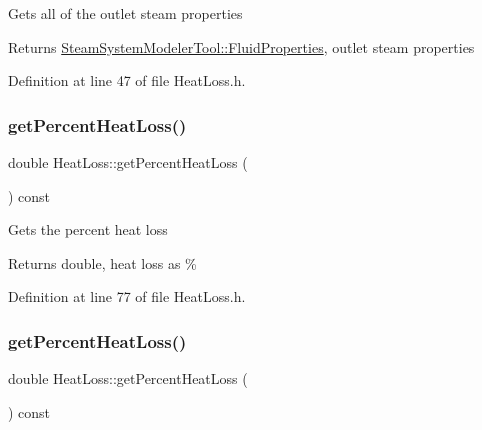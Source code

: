 Gets all of the outlet steam properties \begin{DoxyReturn}{Returns}
\hyperlink{struct_steam_system_modeler_tool_1_1_fluid_properties}{Steam\+System\+Modeler\+Tool\+::\+Fluid\+Properties}, outlet steam properties 
\end{DoxyReturn}


Definition at line 47 of file Heat\+Loss.\+h.

\mbox{\label{class_heat_loss_acbbf01db5cde157057e4d766cab22382}} 
\subsubsection{\texorpdfstring{get\+Percent\+Heat\+Loss()}{getPercentHeatLoss()}\hspace{0.1cm}{\footnotesize\ttfamily [1/3]}}
{\footnotesize\ttfamily double Heat\+Loss\+::get\+Percent\+Heat\+Loss (\begin{DoxyParamCaption}{ }\end{DoxyParamCaption}) const\hspace{0.3cm}{\ttfamily [inline]}}

Gets the percent heat loss \begin{DoxyReturn}{Returns}
double, heat loss as \% 
\end{DoxyReturn}


Definition at line 77 of file Heat\+Loss.\+h.

\mbox{\label{class_heat_loss_acbbf01db5cde157057e4d766cab22382}} 
\subsubsection{\texorpdfstring{get\+Percent\+Heat\+Loss()}{getPercentHeatLoss()}\hspace{0.1cm}{\footnotesize\ttfamily [2/3]}}
{\footnotesize\ttfamily double Heat\+Loss\+::get\+Percent\+Heat\+Loss (\begin{DoxyParamCaption}{ }\end{DoxyParamCaption}) const\hspace{0.3cm}{\ttfamily [inline]}}

